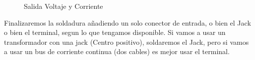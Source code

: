 \documentclass{DccDiyTools}
\begin{document}
\begin{figure}[h]
    \centering
    \caption{Salida Voltaje y Corriente}
    \label{fig:VccOutConnectors}
\end{figure}

Finalizaremos la soldadura añadiendo un solo conector de entrada, o bien el Jack o bien el terminal, segun lo que tengamos
disponible. Si vamos a usar un transformador con una jack (Centro positivo), soldaremos el Jack, pero si vamos a usar un
bus de corriente continua (dos cables) es mejor usar el terminal.
\end{document}
